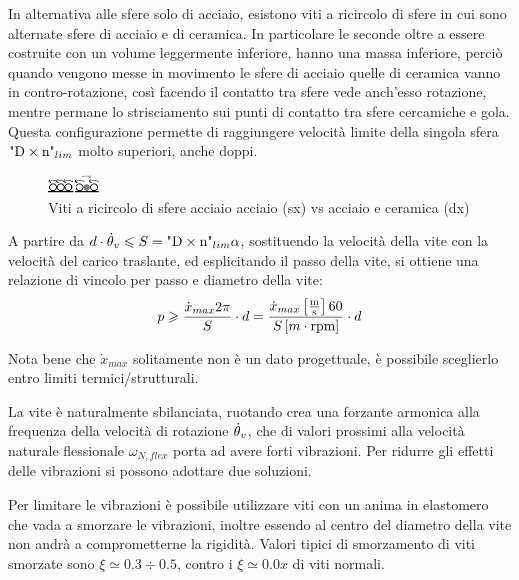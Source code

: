 In alternativa alle sfere solo di acciaio, esistono viti a ricircolo di sfere in cui sono alternate sfere di acciaio e di ceramica. In particolare le seconde oltre a essere costruite con un volume leggermente inferiore, hanno una massa inferiore, perciò quando vengono messe in movimento le sfere di acciaio quelle di ceramica vanno in contro-rotazione, così facendo il contatto tra sfere vede anch'esso rotazione, mentre permane lo strisciamento sui punti di contatto tra sfere cercamiche e gola. Questa configurazione permette di raggiungere velocità limite della singola sfera \( \text{"D}\times \text{n"}_{lim} \) molto superiori, anche doppi.

\begin{figure}[h]
    \centering
    \includegraphics[width=0.12\textwidth]{Immagini/Viti_A_C.png}
    \caption{Viti a ricircolo di sfere acciaio acciaio (sx) vs acciaio e ceramica (dx)}
\end{figure}

A partire da \( d\cdot \dot{\theta}_v \leqslant S = \text{"D}\times \text{n"}_{lim} \alpha \), sostituendo la velocità della vite con la velocità del carico traslante, ed esplicitando il passo della vite, si ottiene una relazione di vincolo per passo e diametro della vite:
\[ p \geqslant \frac{\dot{x}_{max} 2\pi }{S} \cdot d = \frac{\dot{x}_{max} \left[\frac{\text{m}}{\text{s}}\right] 60 }{S \left[ m \cdot \text{rpm} \right] } \cdot d \]

Nota bene che \(\dot{x}_{max}\) solitamente non è un dato progettuale, è possibile sceglierlo entro limiti termici/strutturali.

La vite è naturalmente sbilanciata, ruotando crea una forzante armonica alla frequenza della velocità di rotazione \( \dot{\theta}_v \), che di valori prossimi alla velocità naturale flessionale \(\omega_{N,flex}\) porta ad avere forti vibrazioni.
Per ridurre gli effetti delle vibrazioni si possono adottare due soluzioni.

Per limitare le vibrazioni è possibile utilizzare viti con un anima in elastomero che vada a smorzare le vibrazioni, inoltre essendo al centro del diametro della vite non andrà a comprometterne la rigidità. Valori tipici di smorzamento di viti smorzate sono \(\xi \simeq 0.3 \div 0.5\), contro i \(\xi \simeq 0.0x \) di viti normali.

